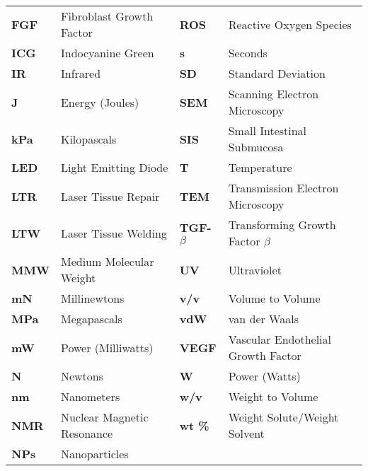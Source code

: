 \begin{table}[!ht]
{\begin{tabular}{llll}
	\textbf{FGF}                      & Fibroblast Growth Factor       & \textbf{ROS}                           & Reactive Oxygen Species              \\
	\textbf{ICG}                      & Indocyanine Green              & \textbf{s}                             & Seconds                              \\
	\textbf{IR}                       & Infrared                       & \textbf{SD}                            & Standard Deviation                   \\
	\textbf{J}                        & Energy (Joules)                & \textbf{SEM}                           & Scanning Electron Microscopy         \\
	\textbf{kPa}                      & Kilopascals                    & \textbf{SIS}                           & Small Intestinal Submucosa           \\
	\textbf{LED}                      & Light Emitting Diode           & \textbf{T}                             & Temperature                          \\
	\textbf{LTR}                      & Laser Tissue Repair            & \textbf{TEM}                           & Transmission Electron Microscopy     \\
	\textbf{LTW}                      & Laser Tissue Welding           & \textbf{\textbf{TGF-\boldmath$\beta$}} & Transforming Growth Factor $\beta$   \\
	\textbf{MMW}                      & Medium Molecular Weight        & \textbf{UV}                            & Ultraviolet                          \\
	\textbf{mN}                       & Millinewtons                   & \textbf{v/v}                           & Volume to Volume                     \\
	\textbf{MPa}                      & Megapascals                    & \textbf{vdW}                           & van der Waals                        \\
	\textbf{mW}                       & Power (Milliwatts)             & \textbf{VEGF}                          & Vascular Endothelial Growth Factor   \\
	\textbf{N}                        & Newtons                        & \textbf{W}                             & Power (Watts)                        \\
	\textbf{nm}                       & Nanometers                     & \textbf{w/v}                           & Weight to Volume                     \\
	\textbf{NMR}                      & Nuclear Magnetic Resonance     & \textbf{wt \%}                         & Weight Solute/Weight Solvent         \\
	\textbf{NPs}                      & Nanoparticles                  & \textbf{}                              &                                     
\end{tabular}
}
\end{table}